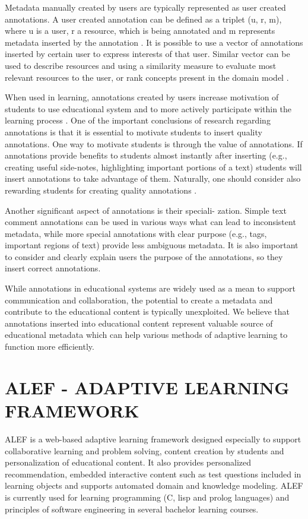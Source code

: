 \documentclass[a4, conference]{IEEEtran}
\begin{document}
Metadata manually created by users are typically represented as user created annotations. A user created annotation can be defined as a triplet (u, r, m), where u is a user, r a resource, which is being annotated and m represents metadata inserted by the annotation \cite{ref:shepitsen2008personalized }. It is possible to use a vector of annotations inserted by certain user to express interests of that user. Similar vector can be used to describe resources and using a similarity measure to evaluate most relevant resources to the user, or rank concepts present in the domain model \cite{ref:vsaloun2010evaluation }.

When used in learning, annotations created by users increase motivation of students to use educational system and to more actively participate within the learning process \cite{ref:bielikova2010alef }. One of the important conclusions of research regarding annotations is that it is essential to motivate students to insert quality annotations. One way to motivate students is through the value of annotations. If annotations provide benefits to students almost instantly after inserting (e.g., creating useful side-notes, highlighting important portions of a text) students will insert annotations to take advantage of them. Naturally, one should consider also rewarding students for creating quality annotations \cite{ref:moro2011towards }.

Another significant aspect of annotations is their speciali- zation. Simple text comment annotations can be used in various ways what can lead to inconsistent metadata, while more special annotations with clear purpose (e.g., tags, important regions of text) provide less ambiguous metadata. It is also important to consider and clearly explain users the purpose of the annotations, so they insert correct annotations.

While annotations in educational systems are widely used as a mean to support communication and collaboration, the 
potential to create a metadata and contribute to the educational content is typically unexploited. We believe that annotations inserted into educational content represent valuable source of educational metadata which can help various methods of adaptive learning to function more efficiently.
\section{ALEF - ADAPTIVE LEARNING FRAMEWORK }%
% 
ALEF is a web-based adaptive learning framework designed especially to support collaborative learning and problem solving, content creation by students and personalization of educational content. It also provides personalized recommendation, embedded interactive content such as test questions included in learning objects and supports automated domain and knowledge modeling. ALEF is currently used for learning programming (C, lisp and prolog languages) and principles of software engineering in several bachelor learning courses.
\end{document}
